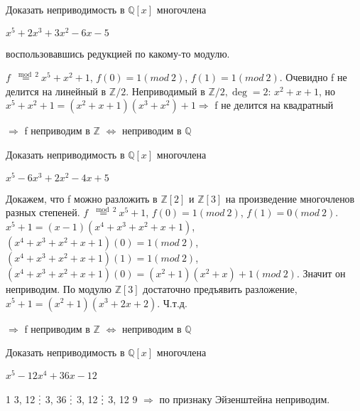 \documentclass[12pt]{article}
\newenvironment{problem}[2][Problem]
{\begin{trivlist}\item[{\bfseries #1} {\bfseries #2.}]}{\end{trivlist}}
\newenvironment{solutions}[2][Solutions]
{\begin{trivlist}\item[{\bfseries #1} {\bfseries #2.}]}{\end{trivlist}}
\begin{document}
\begin{problem}{1} 
Доказать неприводимость в $\mathds{Q}[x]$ многочлена
\begin{center}
$x^5 + 2x^3 + 3x^2 - 6x - 5$
\end{center}
воспользовавшись редукцией по какому-то модулю.
\end{problem}

\begin{solutions}{1} 
$f \stackrel{\mod 2}{=} x^5+x^2+1$, $f(0)=1 (mod\ 2)$, $f(1)=1(mod\ 2)$. 
Очевидно f не делится на линейный в $\mathds{Z}/2$. Неприводимый в $\mathds{Z}/2, \deg = 2$: $x^2+x+1$, но $x^5+x^2+1 = (x^2+x+1)(x^3+x^2)+1 \Rightarrow$ f не делится на квадратный 

$\Rightarrow$ f неприводим в $\mathds{Z}$ $\Leftrightarrow$ неприводим в $\mathds{Q}$
\end{solutions}

\begin{problem}{2} 
Доказать неприводимость в $\mathds{Q}[x]$ многочлена
\begin{center}
$x^5 - 6x^3 + 2x^2 - 4x +5$
\end{center}
\end{problem}

\begin{solutions}{2} 
Докажем, что f можно разложить в $\mathds{Z}[2]$ и $\mathds{Z}[3]$ на произведение многочленов разных степеней. $f \stackrel{\mod 2}{=} x^5+1$, $f(0)=1(mod\ 2)$, $f(1)=0(mod\ 2)$. $x^5+1=(x-1)(x^4+x^3+x^2+x+1)$, $(x^4+x^3+x^2+x+1)(0)=1(mod\ 2)$, $(x^4+x^3+x^2+x+1)(1)=1(mod\ 2)$, $(x^4+x^3+x^2+x+1)(0)=(x^2+1)(x^2+x)+1 (mod\ 2)$. Значит он неприводим. По модулю $\mathds{Z}[3]$ достаточно предъявить разложение, $x^5+1 = (x^2+1)(x^3+2x+2)$. Ч.т.д.

$\Rightarrow$ f неприводим в $\mathds{Z}$ $\Leftrightarrow$ неприводим в $\mathds{Q}$
\end{solutions}

\begin{problem}{3} 
Доказать неприводимость в $\mathds{Q}[x]$ многочлена
\begin{center}
$x^5 - 12x^4 + 36x - 12$
\end{center}
\end{problem}

\begin{solutions}{3} 
1 \xout{$\mathop{\raisebox{-2pt}{\vdots}}$} 3, 12 $\mathop{\raisebox{-2pt}{\vdots}}$ 3, 36 $\mathop{\raisebox{-2pt}{\vdots}}$ 3, 12 $\mathop{\raisebox{-2pt}{\vdots}}$ 3, 12 \xout{$\mathop{\raisebox{-2pt}{\vdots}}$} 9 $\Rightarrow$ по признаку Эйзенштейна неприводим.
\end{solutions}
\end{document}

